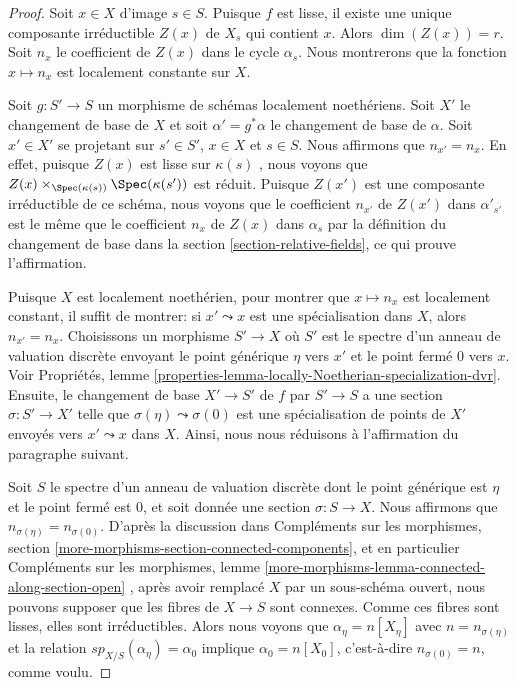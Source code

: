 \begin{proof} 
Soit  $x \in X$  d'image  $s \in S$. Puisque  $f$  est lisse, il existe une
 unique composante irréductible  $Z(x)$  de  $X_s$  qui contient  $x$. 
Alors  $\dim(Z(x)) = r$. 
Soit  $n_x$  le coefficient de $Z(x)$  dans le cycle  $\alpha_s$.
 Nous montrerons que la fonction $x \mapsto n_x$  est localement constante sur  $X$. 

\medskip\noindent
 Soit  $g : S' \to S$  un morphisme de schémas localement noethériens. 
Soit $X'$  le changement de base de  $X$  et soit  $\alpha' = g^*\alpha$
  le changement de base de  $\alpha$. Soit  $x' \in X'$  se projetant sur $s' \in S'$,  
$x \in X$ et  $s \in S$. Nous affirmons que $n_{x'} = n_x$. En effet, puisque  $Z(x)$
  est lisse sur  $\kappa(s)$ , nous voyons que  
$Z(x) \times_{\Spec(\kappa(s))} \Spec(\kappa(s'))$
  est réduit. Puisque  $Z(x')$  est une composante irréductible
 de ce schéma, nous voyons que le coefficient  $n_{x'}$  de  $Z(x')$
  dans  $\alpha'_{s'}$  est le même que le coefficient  $n_x$  de  $Z(x)$
  dans  $\alpha_s$  par la définition du changement de base dans 
la section \ref{section-relative-fields}, 
ce qui prouve l'affirmation. 

\medskip\noindent
 Puisque  $X$  est localement noethérien, pour montrer que  $x \mapsto n_x$
  est localement constant, il suffit de montrer: si  $x' \leadsto x$
  est une spécialisation dans  $X$, alors  $n_{x'} = n_x$.
 Choisissons un morphisme  $S' \to X$  où $S'$  est le spectre d'un anneau de 
valuation discrète envoyant le point générique  $\eta$  vers  $x'$  et le point fermé  
$0$  vers $x$. Voir Propriétés, lemme 
\ref{properties-lemma-locally-Noetherian-specialization-dvr}. Ensuite,
 le changement de base $X' \to S'$  de  $f$  par  $S' \to S$
  a une section  $\sigma : S' \to X'$  telle que $\sigma(\eta) \leadsto \sigma(0)$
  est une spécialisation de points de  $X'$  envoyés vers $x' \leadsto x$  dans  $X$.
 Ainsi, nous nous réduisons à l'affirmation du paragraphe suivant. 

\medskip\noindent
 Soit  $S$  le spectre d'un anneau de valuation discrète dont le 
point générique est  $\eta$  et le point fermé est  $0$, et soit donnée une section 
$\sigma : S  \to X$. Nous affirmons que $n_{\sigma(\eta)} = n_{\sigma(0)}$.
 D'après la discussion dans Compléments sur les morphismes, section 
\ref{more-morphisms-section-connected-components}, et en particulier Compléments
 sur les morphismes, lemme \ref{more-morphisms-lemma-connected-along-section-open} , après
 avoir remplacé  $X$  par un sous-schéma ouvert, nous pouvons supposer que 
les fibres de  $X \to S$  sont connexes. Comme ces fibres sont
 lisses, elles sont irréductibles. Alors nous voyons que  $\alpha_\eta = n[X_\eta]$
  avec $n = n_{\sigma(\eta)}$  et la relation  $sp_{X/S}(\alpha_\eta) = \alpha_0$
  implique  $\alpha_0 = n[X_0]$, c'est-à-dire $n_{\sigma(0)} = n$, comme voulu. 
\end{proof} 


